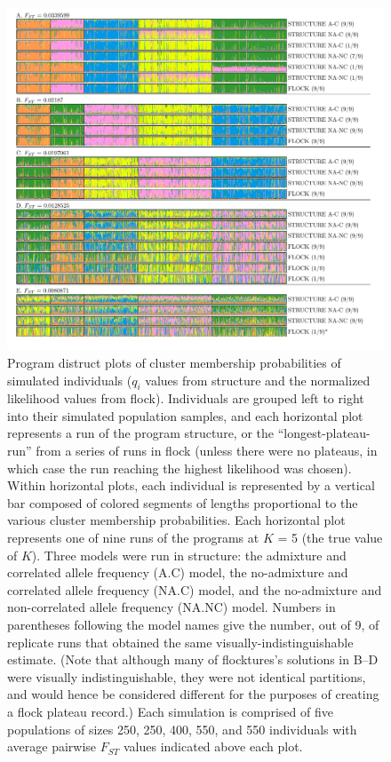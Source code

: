  \begin{figure}
\centering
  \includegraphics[width=.8\linewidth]{images/Figures-Pat/FlockturevStructureDistruct.pdf}%
  \caption{
  Program {\sc distruct} plots of cluster membership probabilities of simulated individuals
  ($q_i$ values from {\sc structure} and the normalized likelihood values from {\sc flock}). 
  Individuals are grouped left to right into their simulated population samples, and each 
  horizontal plot represents a run of the program
  {\sc structure}, or the ``longest-plateau-run'' from a series of runs in {\sc flock} (unless
  there were no plateaus, in which case the run reaching the highest likelihood was chosen).
  Within horizontal plots, each individual is represented by a vertical bar composed of colored
  segments of lengths proportional to the various cluster membership probabilities.
  Each horizontal plot
  represents one of nine 
 runs of the programs  at $K$ = 5 (the true value of $K$). Three models were run in structure: the admixture and correlated allele 
  frequency (A.C) model, 
the no-admixture and correlated allele frequency (NA.C) model, 
and the no-admixture and non-correlated allele frequency (NA.NC) model. Numbers in 
parentheses following the model names give the number, out of 9, of replicate runs
that obtained the same visually-indistinguishable estimate. (Note that although many of {\sc flocktures}'s solutions in B--D were visually indistinguishable, they were not identical partitions, and would
hence be considered different for the purposes of creating a {\sc flock} plateau record.) Each simulation is comprised of
 five populations of sizes 250, 250, 400, 550, and 550 individuals with average pairwise $F_{ST}$ values
 indicated above each plot.}
  \label{fig:FvSdistruct}
\end{figure}

